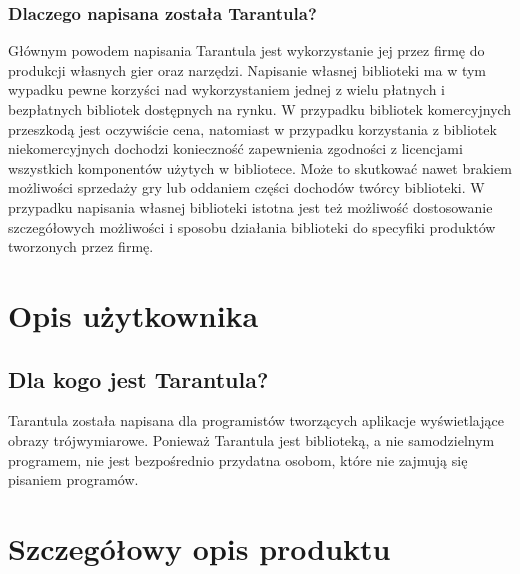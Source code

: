 \documentclass[11pt,leqno]{article}
\begin{document}
\subsubsection{Dlaczego napisana została Tarantula?}
\noindent
Głównym powodem napisania Tarantula jest wykorzystanie jej przez firmę do produkcji własnych gier oraz narzędzi. 
Napisanie własnej biblioteki ma w tym wypadku pewne korzyści nad wykorzystaniem jednej z wielu płatnych i bezpłatnych bibliotek 
dostępnych na rynku. W przypadku bibliotek komercyjnych przeszkodą jest oczywiście cena, natomiast w przypadku korzystania z bibliotek niekomercyjnych dochodzi konieczność zapewnienia zgodności z licencjami wszystkich komponentów użytych w bibliotece. Może to skutkować nawet 
brakiem możliwości sprzedaży gry lub oddaniem części dochodów twórcy biblioteki. W przypadku napisania własnej biblioteki istotna jest też możliwość dostosowanie szczegółowych 
możliwości i sposobu działania biblioteki do specyfiki produktów tworzonych przez firmę.

\section{Opis użytkownika}
\subsection{Dla kogo jest Tarantula?}
\noindent
Tarantula została napisana dla programistów tworzących aplikacje wyświetlające obrazy trójwymiarowe. Ponieważ Tarantula jest biblioteką, a nie samodzielnym programem, 
nie jest bezpośrednio przydatna osobom, które nie zajmują się pisaniem programów.

\section{Szczegółowy opis produktu}
\end{document}
